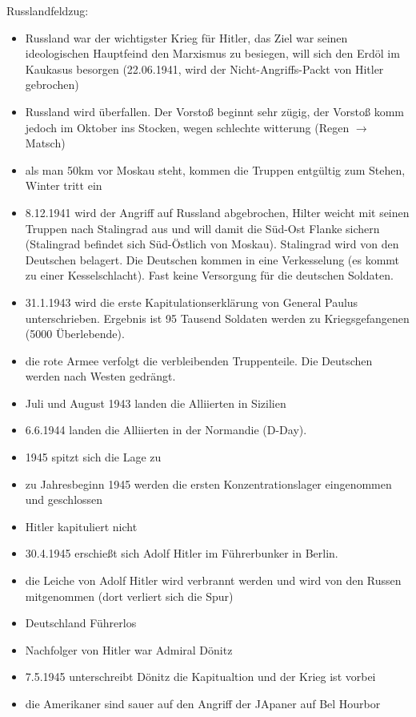 \documentclass[a4paper,final]{report}
\begin{document}
Russlandfeldzug:
	\begin{itemize}
	\item Russland war der wichtigster Krieg für Hitler, das Ziel war seinen ideologischen Hauptfeind den Marxismus zu besiegen, will sich den Erdöl im 		Kaukasus besorgen (22.06.1941, wird der Nicht-Angriffs-Packt von Hitler gebrochen)
	\item Russland wird überfallen. Der Vorstoß beginnt sehr zügig, der Vorstoß komm jedoch im Oktober ins Stocken, wegen schlechte witterung (Regen 			$\rightarrow$ Matsch)
	\item als man 50km vor Moskau steht, kommen die Truppen entgültig zum Stehen, Winter tritt ein
	\item 8.12.1941 wird der Angriff auf Russland abgebrochen, Hilter weicht mit seinen Truppen nach Stalingrad aus und will damit die Süd-Ost Flanke
	sichern (Stalingrad befindet sich Süd-Östlich von Moskau). Stalingrad wird von den Deutschen belagert. Die Deutschen kommen in eine Verkesselung
	(es kommt zu einer Kesselschlacht). Fast keine Versorgung für die deutschen Soldaten.
	\item 31.1.1943 wird die erste Kapitulationserklärung von General Paulus unterschrieben. Ergebnis ist 95 Tausend Soldaten werden zu Kriegsgefangenen
	(5000 Überlebende).
	\item die rote Armee verfolgt die verbleibenden Truppenteile. Die Deutschen werden nach Westen gedrängt.
	\item Juli und August 1943 landen die Alliierten in Sizilien
	\item 6.6.1944 landen die Alliierten in der Normandie (D-Day).
	\item 1945 spitzt sich die Lage zu
	\item zu Jahresbeginn 1945 werden die ersten Konzentrationslager eingenommen und geschlossen
	\item Hitler kapituliert nicht
	\item 30.4.1945 erschießt sich Adolf Hitler im Führerbunker in Berlin.
	\item die Leiche von Adolf Hitler wird verbrannt werden und wird von den Russen mitgenommen (dort verliert sich die Spur)
	\item Deutschland Führerlos
	\item Nachfolger  von Hitler war Admiral Dönitz
	\item 7.5.1945 unterschreibt Dönitz die Kapitualtion und der Krieg ist vorbei
	\item die Amerikaner sind sauer auf den Angriff der JApaner auf Bel Hourbor

\end{itemize}
\end{document}
